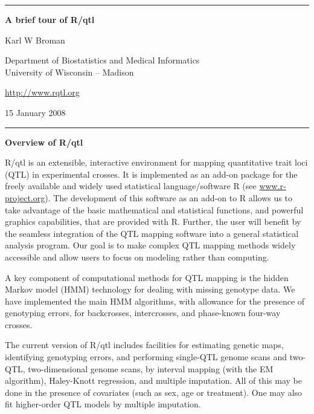 \documentclass[10pt,letterpaper]{article}
\begin{document}
\begin{center}
\rule{7.0in}{1mm} \vspace{0mm}

{\Large \textbf{A brief tour of R/qtl}} \vspace{4mm}

{\large Karl W Broman} \vspace{2mm}

Department of Biostatistics and Medical Informatics\\
University of Wisconsin -- Madison

\vspace{2mm}
\href{http://www.rqtl.org}{http://www.rqtl.org}
\vspace{2mm}

15 January 2008 %

\rule{7.0in}{1mm} 
\end{center}

\noindent \textbf{Overview of R/qtl} \vspace{6pt}

R/qtl is an extensible, interactive environment for mapping
quantitative trait loci (QTL) in experimental crosses. It is
implemented as an add-on package for the freely available and widely
used statistical language/software R (see
\href{http://www.r-project.org}{www.r-project.org}). The development
of this software as an add-on to R allows us to take advantage of the
basic mathematical and statistical functions, and powerful graphics
capabilities, that are provided with R. Further, the user will benefit
by the seamless integration of the QTL mapping software into a general
statistical analysis program.  Our goal is to make complex QTL mapping
methods widely accessible and allow users to focus on modeling rather
than computing.

A key component of computational methods for QTL mapping is the hidden
Markov model (HMM) technology for dealing with missing genotype
data. We have implemented the main HMM algorithms, with allowance for
the presence of genotyping errors, for backcrosses, intercrosses, and
phase-known four-way crosses.

The current version of R/qtl includes facilities for estimating
genetic maps, identifying genotyping errors, and performing single-QTL
genome scans and two-QTL, two-dimensional genome scans, by interval
mapping (with the EM algorithm), Haley-Knott regression, and multiple
imputation. All of this may be done in the presence of covariates
(such as sex, age or treatment). One may also fit higher-order QTL models
by multiple imputation.
\end{document}
